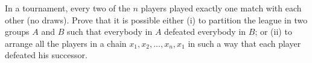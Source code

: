 In a tournament, every two of the $n$ players played exactly one match with each other (no
draws). Prove that it is possible either
(i) to partition the league in two groups $A$ and $B$ such that everybody in $A$ defeated everybody in $B$; or
(ii) to arrange all the players in a chain $x_1, x_2, . . . , x_n, x_1$ in such a way that each player defeated his successor.